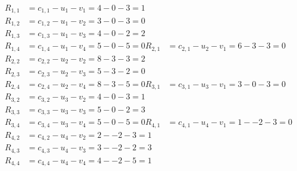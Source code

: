 \[
\begin{aligned}
R_{1,1} &= c_{1,1} - u_{1} - v_{1} = 4 - 0 - 3 = 1 \\
R_{1,2} &= c_{1,2} - u_{1} - v_{2} = 3 - 0 - 3 = 0 \\
R_{1,3} &= c_{1,3} - u_{1} - v_{3} = 4 - 0 - 2 = 2 \\
R_{1,4} &= c_{1,4} - u_{1} - v_{4} = 5 - 0 - 5 = 0 
R_{2,1} &= c_{2,1} - u_{2} - v_{1} = 6 - 3 - 3 = 0 \\
R_{2,2} &= c_{2,2} - u_{2} - v_{2} = 8 - 3 - 3 = 2 \\
R_{2,3} &= c_{2,3} - u_{2} - v_{3} = 5 - 3 - 2 = 0 \\
R_{2,4} &= c_{2,4} - u_{2} - v_{4} = 8 - 3 - 5 = 0 
R_{3,1} &= c_{3,1} - u_{3} - v_{1} = 3 - 0 - 3 = 0 \\
R_{3,2} &= c_{3,2} - u_{3} - v_{2} = 4 - 0 - 3 = 1 \\
R_{3,3} &= c_{3,3} - u_{3} - v_{3} = 5 - 0 - 2 = 3 \\
R_{3,4} &= c_{3,4} - u_{3} - v_{4} = 5 - 0 - 5 = 0 
R_{4,1} &= c_{4,1} - u_{4} - v_{1} = 1 - -2 - 3 = 0 \\
R_{4,2} &= c_{4,2} - u_{4} - v_{2} = 2 - -2 - 3 = 1 \\
R_{4,3} &= c_{4,3} - u_{4} - v_{3} = 3 - -2 - 2 = 3 \\
R_{4,4} &= c_{4,4} - u_{4} - v_{4} = 4 - -2 - 5 = 1 
\end{aligned}
\]

